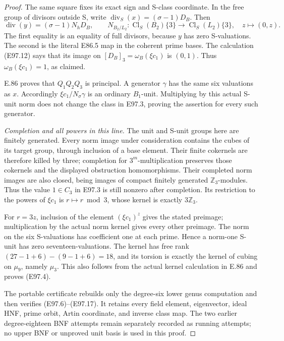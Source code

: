 \begin{proof}
The same square fixes its exact sign and S-class
coordinate. In the free group of divisors outside S,
write \(\operatorname{div}_S(x)=(\sigma-1)D_B\).
Then
\[
 \operatorname{div}(y)=(\sigma-1)N_hD_B,\qquad
 N_{B_2/L_2}:\operatorname{Cl}_S(B_2)\{3\}\longrightarrow
       \operatorname{Cl}_S(L_2)\{3\},\quad
 z\longmapsto(0,z).
 \tag{E97.17}
\]
The first equality is an equality of full divisors,
because \(y\) has zero S-valuations. The second is
the literal E86.5 map in the coherent prime bases.
The calculation (E97.12) says that its image on
\([D_B]_3=\omega_B(\xi c_1)\) is \((0,1)\).
Thus \(\omega_B(\xi c_1)=1\), as claimed.

E.86 proves that \(Q_1Q_2Q_3\) is principal. A generator
\(\gamma\) has the same six valuations as \(x\).
Accordingly \(\xi c_1/N_\sigma\gamma\) is an ordinary
\(B_1\)-unit. Multiplying by this actual S-unit norm
does not change the class in E97.3, proving the
assertion for every such generator.

\emph{Completion and all powers in this line.}
The unit and S-unit groups here are finitely generated.
Every norm image under consideration contains the cubes
of its target group, through inclusion of a base element.
Their finite cokernels are therefore killed by three;
completion for \(3^m\)-multiplication preserves those
cokernels and the displayed obstruction homomorphisms.
Their completed norm images are also closed, being
images of compact finitely generated \(\mathbb Z_3\)-modules.
Thus the value \(1\in C_3\) in E97.3 is still nonzero
after completion. Its restriction to the powers of
\(\xi c_1\) is \(r\mapsto r\bmod3\), whose kernel is
exactly \(3\mathbb Z_3\).

For \(r=3z\), inclusion of the element
\((\xi c_1)^z\) gives the stated preimage; multiplication
by the actual norm kernel gives every other preimage.
The norm on the six S-valuations has coefficient one
at each prime. Hence a norm-one S-unit has zero
seventeen-valuations. The kernel has free rank
\((27-1+6)-(9-1+6)=18\), and its torsion is exactly
the kernel of cubing on \(\mu_9\), namely \(\mu_3\).
This also follows from the actual kernel calculation
in E.86 and proves (E97.4).

The portable certificate rebuilds only the degree-six
lower genus computation and then verifies (E97.6)--(E97.17).
It retains every field element, eigenvector, ideal HNF,
prime orbit, Artin coordinate, and inverse class map.
The two earlier degree-eighteen BNF attempts remain
separately recorded as running attempts; no upper BNF
or unproved unit basis is used in this proof.
\end{proof}
